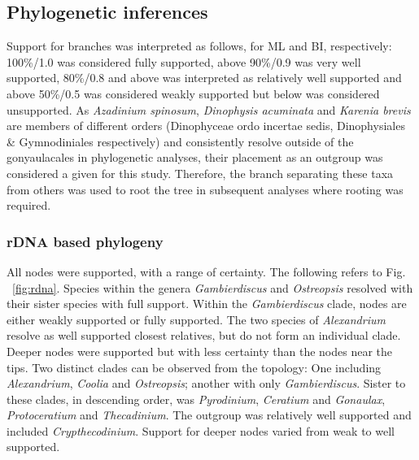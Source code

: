\documentclass[12pt]{article}
\begin{document}
\subsection*{Phylogenetic inferences}
Support for branches was interpreted as follows, for ML and BI, respectively: 100\%/1.0 was considered fully supported, above 90\%/0.9 was very well supported, 80\%/0.8 and above was interpreted as relatively well supported and above 50\%/0.5 was considered weakly supported but below was considered unsupported.
As \emph{Azadinium spinosum}, \emph{Dinophysis acuminata} and \emph{Karenia brevis} are members of different orders (Dinophyceae ordo incertae sedis, Dinophysiales \& Gymnodiniales respectively) and consistently resolve outside of the gonyaulacales in phylogenetic analyses, their placement as an outgroup was considered a given for this study. 
Therefore, the branch separating these taxa from others was used to root the tree in subsequent analyses where rooting was required.
\subsubsection*{rDNA based phylogeny}
\FloatBarrier 
All nodes were supported, with a range of certainty.
The following refers to Fig. ~\ref{fig:rdna}.
Species within the genera \emph{Gambierdiscus} and \emph{Ostreopsis} resolved with their sister species with full support. 
Within the \emph{Gambierdiscus} clade, nodes are either weakly supported or fully supported. 
The two species of \emph{Alexandrium} resolve as well supported closest relatives, but do not form an individual clade. 
Deeper nodes were supported but with less certainty than the nodes near the tips. 
Two distinct clades can be observed from the topology: One including \emph{Alexandrium}, \emph{Coolia} and \emph{Ostreopsis}; another with only \emph{Gambierdiscus}. 
Sister to these clades, in descending order, was \emph{Pyrodinium}, \emph{Ceratium} and \emph{Gonaulax}, \emph{Protoceratium} and \emph{Thecadinium}. 
The outgroup was relatively well supported and included \emph{Crypthecodinium}. 
Support for deeper nodes varied from weak to well supported.
\end{document}

